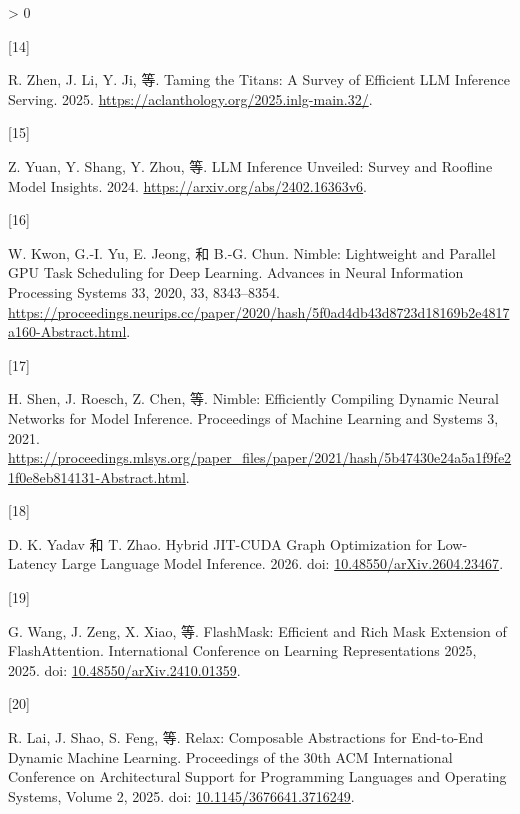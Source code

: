 \documentclass[
  UTF8,
  zihao=5]{ctexart}
\newlength{\cslhangindent}
\newlength{\csllabelwidth}
\newenvironment{CSLReferences}[2] %
 {%
  \setlength{\parindent}{0pt}
  \ifodd #1 \everypar{\setlength{\hangindent}{\cslhangindent}}\ignorespaces\fi
  \ifnum #2 > 0
  \setlength{\parskip}{#2\baselineskip}
  \fi
 }%
 {}
\newcommand{\CSLLeftMargin}[1]{\parbox[t]{\csllabelwidth}{#1}}
\newcommand{\CSLRightInline}[1]{\parbox[t]{\linewidth - \csllabelwidth}{#1}\par}
\begin{document}
\begin{CSLReferences}{0}{0}
\leavevmode{}%
\CSLLeftMargin{{[}14{]} }%
\CSLRightInline{R. Zhen, J. Li, Y. Ji, 等. Taming the Titans: A Survey
of Efficient LLM Inference Serving. 2025.
\url{https://aclanthology.org/2025.inlg-main.32/}.}

\leavevmode{}%
\CSLLeftMargin{{[}15{]} }%
\CSLRightInline{Z. Yuan, Y. Shang, Y. Zhou, 等. LLM Inference Unveiled:
Survey and Roofline Model Insights. 2024.
\url{https://arxiv.org/abs/2402.16363v6}.}

\leavevmode{}%
\CSLLeftMargin{{[}16{]} }%
\CSLRightInline{W. Kwon, G.-I. Yu, E. Jeong, 和 B.-G. Chun. Nimble:
Lightweight and Parallel GPU Task Scheduling for Deep Learning. Advances
in Neural Information Processing Systems 33, 2020, 33, 8343--8354.
\url{https://proceedings.neurips.cc/paper/2020/hash/5f0ad4db43d8723d18169b2e4817a160-Abstract.html}.}

\leavevmode{}%
\CSLLeftMargin{{[}17{]} }%
\CSLRightInline{H. Shen, J. Roesch, Z. Chen, 等. {Nimble: Efficiently
Compiling Dynamic Neural Networks for Model Inference}. Proceedings of
Machine Learning and Systems 3, 2021.
\url{https://proceedings.mlsys.org/paper_files/paper/2021/hash/5b47430e24a5a1f9fe21f0e8eb814131-Abstract.html}.}

\leavevmode{}%
\CSLLeftMargin{{[}18{]} }%
\CSLRightInline{D. K. Yadav 和 T. Zhao. {Hybrid JIT-CUDA Graph
Optimization for Low-Latency Large Language Model Inference}. 2026. doi:
\href{https://doi.org/10.48550/arXiv.2604.23467}{10.48550/arXiv.2604.23467}.}

\leavevmode{}%
\CSLLeftMargin{{[}19{]} }%
\CSLRightInline{G. Wang, J. Zeng, X. Xiao, 等. FlashMask: Efficient and
Rich Mask Extension of FlashAttention. International Conference on
Learning Representations 2025, 2025. doi:
\href{https://doi.org/10.48550/arXiv.2410.01359}{10.48550/arXiv.2410.01359}.}

\leavevmode{}%
\CSLLeftMargin{{[}20{]} }%
\CSLRightInline{R. Lai, J. Shao, S. Feng, 等. {Relax: Composable
Abstractions for End-to-End Dynamic Machine Learning}. Proceedings of
the 30th ACM International Conference on Architectural Support for
Programming Languages and Operating Systems, Volume 2, 2025. doi:
\href{https://doi.org/10.1145/3676641.3716249}{10.1145/3676641.3716249}.}


\end{CSLReferences}
\end{document}
